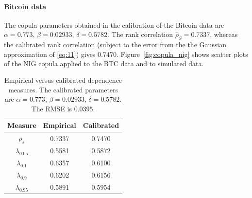 
\paragraph{Bitcoin data}

The copula parameters obtained in the calibration of the Bitcoin data
are $\alpha=0.773$, $\beta=0.02933$, $\delta=0.5782$. The 
rank correlation $\hat\rho_S=0.7337$, whereas the calibrated rank
correlation (subject to the error from the the Gaussian approximation
of \eqref{eq:11}) gives $0.7470$. Figure~\ref{fig:copula_nig} shows
scatter plots of the NIG copula applied to the BTC data and to
simulated data. 

\begin{table}[t]
  \centering
  \begin{tabular}{|c||c|c|}
    \hline %
    Measure & Empirical & Calibrated\\\hline
    $\rho_s$ & 0.7337 & 0.7470\\
    $\lambda_{0.05}$ & 0.5581 & 0.5872\\
    $\lambda_{0.1}$ & 0.6357 & 0.6100\\
    $\lambda_{0.9}$ & 0.6202 & 0.6156\\
    $\lambda_{0.95}$ & 0.5891 & 0.5954\\\hline
  \end{tabular}
  \caption{Empirical versus calibrated dependence measures. The
    calibrated parameters are $\alpha=0.773$, $\beta=0.02933$,
    $\delta=0.5782$. The RMSE is $0.0395$.}
  \label{tab:nigcopula}
\end{table}

